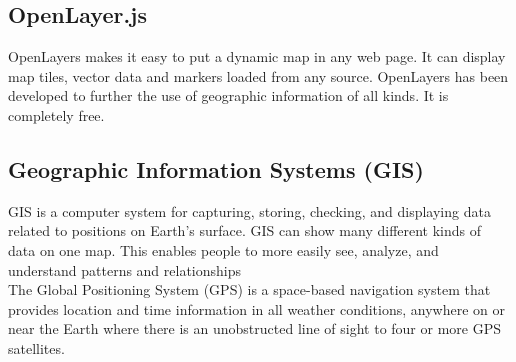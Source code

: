 \subsection{OpenLayer.js}
OpenLayers makes it easy to put a dynamic map in any web page. It can display map tiles, vector data and markers loaded from any source. OpenLayers has been developed to further the use of geographic information of all kinds. It is completely free.\\
\subsection{Geographic Information Systems (GIS)}
GIS is a computer system for capturing, storing, checking, and displaying data related to positions on Earth’s surface. GIS can show many different kinds of data on one map. This enables people to more easily see, analyze, and understand patterns and relationships\\
The Global Positioning System (GPS) is a space-based navigation system that provides location and time information in all weather conditions, anywhere on or near the Earth where there is an unobstructed line of sight to four or more GPS satellites.\\
\fi
